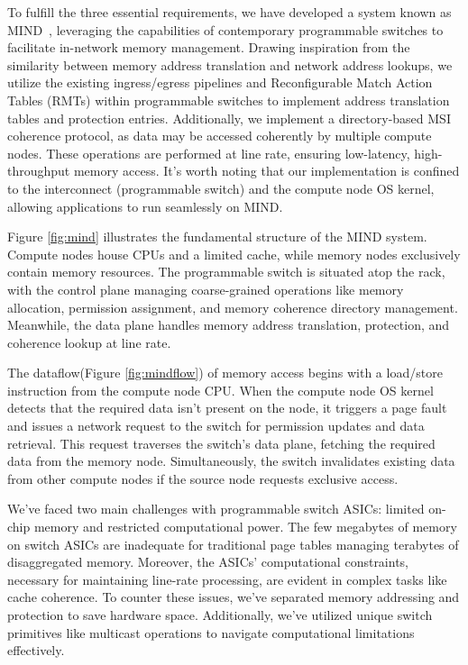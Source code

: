 To fulfill the three essential requirements, we have developed a system known as MIND~\cite{mind}, leveraging the capabilities of contemporary programmable switches to facilitate in-network memory management. Drawing inspiration from the similarity between memory address translation and network address lookups, we utilize the existing ingress/egress pipelines and Reconfigurable Match Action Tables (RMTs)\cite{rmt} within programmable switches to implement address translation tables and protection entries. Additionally, we implement a directory-based MSI coherence protocol\cite{msi}, as data may be accessed coherently by multiple compute nodes. These operations are performed at line rate, ensuring low-latency, high-throughput memory access. It's worth noting that our implementation is confined to the interconnect (programmable switch) and the compute node OS kernel, allowing applications to run seamlessly on MIND.

Figure \ref{fig:mind} illustrates the fundamental structure of the MIND system. Compute nodes house CPUs and a limited cache, while memory nodes exclusively contain memory resources. The programmable switch is situated atop the rack, with the control plane managing coarse-grained operations like memory allocation, permission assignment, and memory coherence directory management. Meanwhile, the data plane handles memory address translation, protection, and coherence lookup at line rate.

The dataflow(Figure \ref{fig:mindflow}) of memory access begins with a load/store instruction from the compute node CPU. When the compute node OS kernel detects that the required data isn't present on the node, it triggers a page fault and issues a network request to the switch for permission updates and data retrieval. This request traverses the switch's data plane, fetching the required data from the memory node. Simultaneously, the switch invalidates existing data from other compute nodes if the source node requests exclusive access.

We've faced two main challenges with programmable switch ASICs: limited on-chip memory and restricted computational power. The few megabytes of memory on switch ASICs are inadequate for traditional page tables managing terabytes of disaggregated memory. Moreover, the ASICs' computational constraints, necessary for maintaining line-rate processing, are evident in complex tasks like cache coherence. To counter these issues, we've separated memory addressing and protection to save hardware space. Additionally, we've utilized unique switch primitives like multicast operations to navigate computational limitations effectively.





